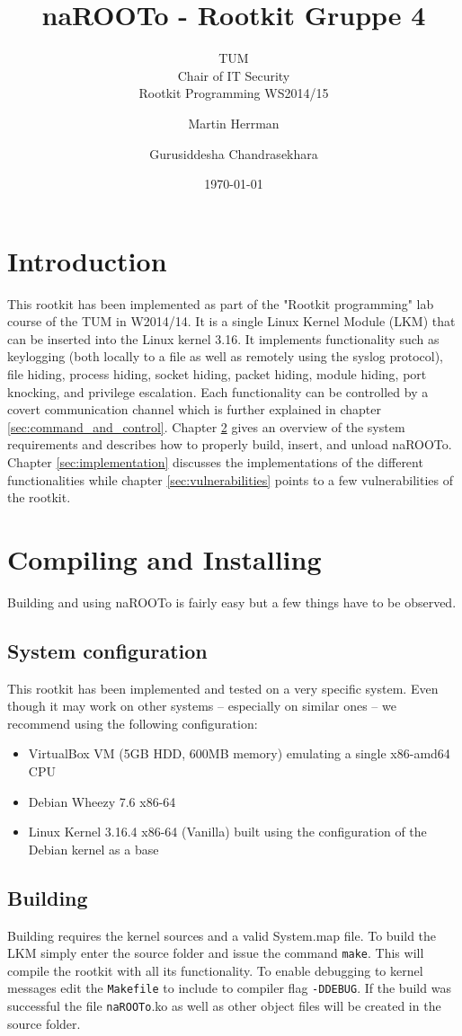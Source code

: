 \documentclass[10pt, letterpaper]{scrartcl}
\title{naROOTo - Rootkit Gruppe 4}
\subtitle{TUM \\Chair of IT Security\\  Rootkit Programming WS2014/15}
\author{Martin Herrman \and Gurusiddesha Chandrasekhara}
\date{\today}
\begin{document}
\maketitle
\tableofcontents
\newpage

\section{Introduction}
This rootkit has been implemented as part of the "Rootkit programming" lab course of the TUM in W2014/14. 
It is a single Linux Kernel Module (LKM) that can be inserted into the Linux kernel 3.16. 
It implements functionality such as keylogging (both locally to a file as well as remotely using the syslog protocol), file hiding, process hiding, socket hiding, packet hiding, module hiding, port knocking, and privilege escalation. Each functionality can be controlled by a covert communication channel which is further explained in chapter \ref{sec:command_and_control}.
Chapter \ref{sec:compiling_and_installing} gives an overview of the system requirements and describes how to properly build, insert, and unload naROOTo.
Chapter \ref{sec:implementation} discusses the implementations of the different functionalities while chapter \ref{sec:vulnerabilities} points to a few vulnerabilities of the rootkit.

\section{Compiling and Installing}\label{sec:compiling_and_installing}
Building and using naROOTo is fairly easy but a few things have to be observed.
\subsection{System configuration}
This rootkit has been implemented and tested on a very specific system. Even though it may work on other systems -- especially on similar ones -- we recommend using the following configuration:
\begin{itemize}
    \item VirtualBox VM (5GB HDD, 600MB memory) emulating a single x86-amd64 CPU
    \item Debian Wheezy 7.6 x86-64
    \item Linux Kernel 3.16.4 x86-64 (Vanilla) built using the configuration of the Debian kernel as a base
\end{itemize}

\subsection{Building}
Building requires the kernel sources and a valid System.map file. To build the LKM simply enter the source folder and issue the command \texttt{make}.
This will compile the rootkit with all its functionality. To enable debugging to kernel messages edit the \texttt{Makefile} to include to compiler flag \texttt{-DDEBUG}.
If the build was successful the file \texttt{naROOTo}.ko as well as other object files will be created in the source folder.
\end{document}

